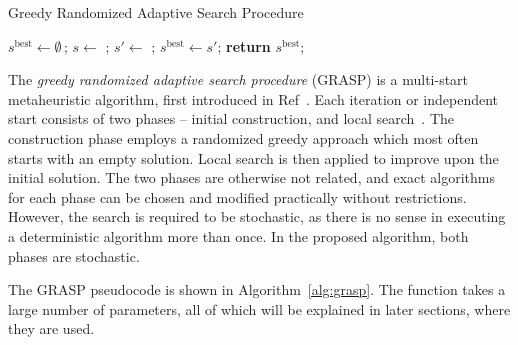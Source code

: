 \begin{algorithm}[tb]
    \caption{Greedy Randomized Adaptive Search Procedure}
    \label{alg:grasp}
    
    \newcommand{\Stemp}{s'}
    \newcommand{\Sbest}{s^{\mathrm{best}}}
    
    \begin{algorithmic}[1]
            \State $\Sbest \gets \emptyset$\,;
             \label{alg:grasp-line-for-loop}
                \State $s \gets$ ;
                \State $\Stemp \gets$ ;
                \If{$f(\Stemp) > f(\Sbest)$} \label{alg:grasp-line-if-better}
                    \State $\Sbest \gets \Stemp$;
                \EndIf
            \EndFor
            \State \textbf{return} $\Sbest$;
        \EndProcedure
    \end{algorithmic}
\end{algorithm}

The \textit{greedy randomized adaptive search procedure} (GRASP) is a multi-start metaheuristic algorithm, first introduced in Ref~\cite{Feo/GraspFirst}.
Each iteration or independent start consists of two phases -- initial construction, and local search~\cite{Feo/GraspReview}.
The construction phase employs a randomized greedy approach which most often starts with an empty solution.
Local search is then applied to improve upon the initial solution.
The two phases are otherwise not related, and exact algorithms for each phase can be chosen and modified practically without restrictions.
However, the search is required to be stochastic, as there is no sense in executing a deterministic algorithm more than once.
In the proposed algorithm, both phases are stochastic.

The GRASP pseudocode is shown in Algorithm~\ref{alg:grasp}.
The function takes a large number of parameters, all of which will be explained in later sections, where they are used.

